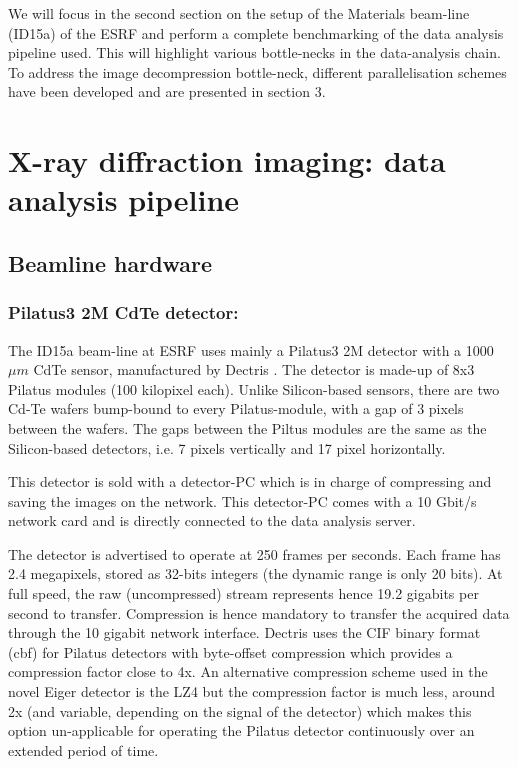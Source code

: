 \documentclass[preprint, pdf]{iucr}              %
\begin{document}
We will focus in the second section on the setup of the Materials beam-line
(ID15a) of the ESRF  \cite{id15a} and perform a complete benchmarking of the
data analysis pipeline used. 
This will highlight various bottle-necks in the data-analysis chain.
To address the image decompression bottle-neck, different parallelisation
schemes have been developed and are presented in section 3. 

\section{X-ray diffraction imaging: data analysis pipeline}

\subsection{Beamline hardware}

\subsubsection{Pilatus3 2M CdTe detector:}

The ID15a beam-line at ESRF uses mainly a Pilatus3 2M detector with a 1000 $\mu
m$ CdTe sensor, manufactured by Dectris \cite{dectris}. 
The detector is made-up of 8x3 Pilatus modules (100 kilopixel each).
Unlike Silicon-based sensors, there are two Cd-Te wafers bump-bound to every
Pilatus-module, with a gap of 3 pixels between the wafers.
The gaps between the Piltus modules are the same as the Silicon-based
detectors, i.e. 7 pixels vertically and 17 pixel horizontally.

This detector is sold with a detector-PC which is in charge of compressing and
saving the images on the network. 
This detector-PC comes with a 10 Gbit/s network card and is directly connected
to the data analysis server.

The detector is advertised to operate at 250 frames per seconds. 
Each frame has 2.4 megapixels, stored as 32-bits integers (the dynamic range is
only 20 bits).
At full speed, the raw (uncompressed) stream represents hence 19.2 gigabits per
second to transfer. 
Compression is hence mandatory to transfer the acquired data through the 10
gigabit network interface.
Dectris uses the CIF binary format (cbf) \cite{cbf} for Pilatus detectors
with byte-offset compression which provides a compression factor close to 4x. 
An alternative compression scheme used in the novel Eiger detector is the LZ4
but the compression factor is much less, around 2x (and variable, depending on
the signal of the detector) which makes this option un-applicable for operating
the Pilatus detector continuously over an extended period of time.
\end{document}
